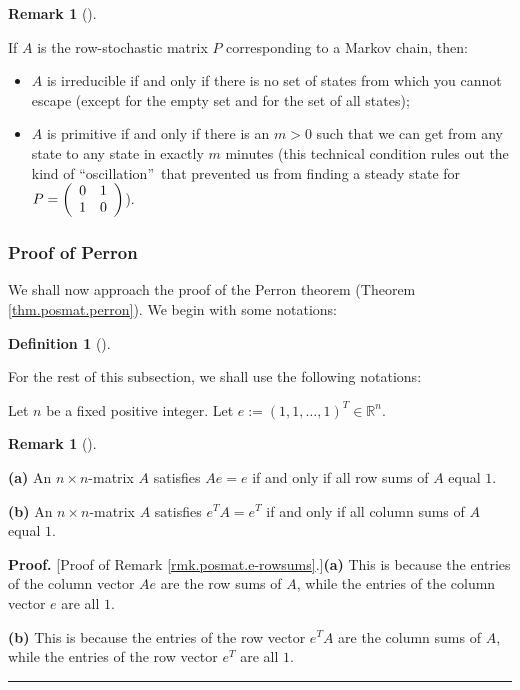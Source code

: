 \documentclass[numbers=enddot,12pt,final,onecolumn,notitlepage]{scrartcl}%
\numberwithin{exer}{subsection}
\theoremstyle{definition}
\newtheorem{defi}[theo]{Definition}
\newenvironment{definition}[1][]
{\begin{defi}[#1]\begin{leftbar}}
{\end{leftbar}\end{defi}}
\newtheorem{remk}[theo]{Remark}
\newenvironment{remark}[1][]
{\begin{remk}[#1]\begin{leftbar}}
{\end{leftbar}\end{remk}}
\newenvironment{proof}[1][Proof]{\noindent\textbf{#1.} }{\ \rule{0.5em}{0.5em}}
\begin{document}
\begin{remark}
If $A$ is the row-stochastic matrix $P$ corresponding to a Markov chain, then:

\begin{itemize}
\item $A$ is irreducible if and only if there is no set of states from which
you cannot escape (except for the empty set and for the set of all states);

\item $A$ is primitive if and only if there is an $m>0$ such that we can get
from any state to any state in exactly $m$ minutes (this technical condition
rules out the kind of \textquotedblleft oscillation\textquotedblright\ that
prevented us from finding a steady state for $P=\left(
\begin{array}
[c]{cc}%
0 & 1\\
1 & 0
\end{array}
\right)  $).
\end{itemize}
\end{remark}

\subsubsection{Proof of Perron}

We shall now approach the proof of the Perron theorem (Theorem
\ref{thm.posmat.perron}). We begin with some notations:

\begin{definition}
For the rest of this subsection, we shall use the following notations:

Let $n$ be a fixed positive integer. Let $e:=\left(  1,1,\ldots,1\right)
^{T}\in\mathbb{R}^{n}$.
\end{definition}

\begin{remark}
\label{rmk.posmat.e-rowsums}\textbf{(a)} An $n\times n$-matrix $A$ satisfies
$Ae=e$ if and only if all row sums of $A$ equal $1$. \medskip

\textbf{(b)} An $n\times n$-matrix $A$ satisfies $e^{T}A=e^{T}$ if and only if
all column sums of $A$ equal $1$.
\end{remark}

\begin{proof}
[Proof of Remark \ref{rmk.posmat.e-rowsums}.]\textbf{(a)} This is because the
entries of the column vector $Ae$ are the row sums of $A$, while the entries
of the column vector $e$ are all $1$. \medskip

\textbf{(b)} This is because the entries of the row vector $e^{T}A$ are the
column sums of $A$, while the entries of the row vector $e^{T}$ are all $1$.
\end{proof}
\end{document}
